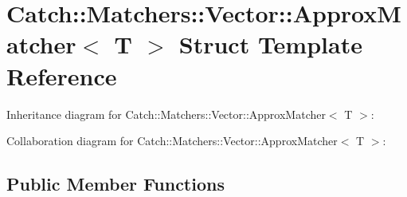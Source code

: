 \hypertarget{structCatch_1_1Matchers_1_1Vector_1_1ApproxMatcher}{}\section{Catch\+:\+:Matchers\+:\+:Vector\+:\+:Approx\+Matcher$<$ T $>$ Struct Template Reference}
\label{structCatch_1_1Matchers_1_1Vector_1_1ApproxMatcher}


Inheritance diagram for Catch\+:\+:Matchers\+:\+:Vector\+:\+:Approx\+Matcher$<$ T $>$\+:


Collaboration diagram for Catch\+:\+:Matchers\+:\+:Vector\+:\+:Approx\+Matcher$<$ T $>$\+:
\subsection*{Public Member Functions}
